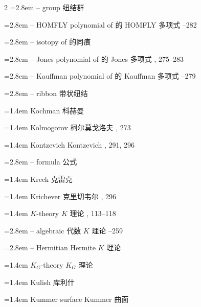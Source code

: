 \begin{multicols}{2}
\noindent\hangindent=2.8em -- group \quad 纽结群 \par
\noindent\hangindent=2.8em -- HOMFLY polynomial of \quad 的 HOMFLY 多项式 --282\par
\noindent\hangindent=2.8em -- isotopy of \quad 的同痕 \par
\noindent\hangindent=2.8em -- Jones polynomial of \quad 的 Jones 多项式 , 275--283\par
\noindent\hangindent=2.8em -- Kauffman polynomial of \quad 的 Kauffman 多项式 --279\par
\noindent\hangindent=2.8em -- ribbon \quad 带状纽结 \par
\noindent\hangindent=1.4em Kochman \quad 科赫曼 \par
\noindent\hangindent=1.4em Kolmogorov \quad 柯尔莫戈洛夫 , 273\par
\noindent\hangindent=1.4em Kontzevich \quad Kontzevich , 291, 296\par
\noindent\hangindent=2.8em -- formula \quad 公式 \par
\noindent\hangindent=1.4em Kreck \quad 克雷克 \par
\noindent\hangindent=1.4em Krichever \quad 克里切韦尔 , 296\par
\noindent\hangindent=1.4em $K$-theory \quad $K$ 理论 , 113--118\par
\noindent\hangindent=2.8em -- algebraic \quad 代数 $K$ 理论 --259\par
\noindent\hangindent=2.8em -- Hermitian \quad Hermite $K$ 理论 \par
\noindent\hangindent=1.4em $K_G$-theory \quad $K_G$ 理论 \par
\noindent\hangindent=1.4em Kulish \quad 库利什 \par
\noindent\hangindent=1.4em Kummer surface \quad Kummer 曲面 \par
\end{multicols}

